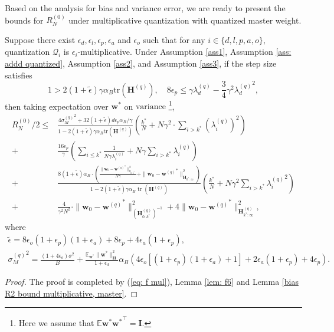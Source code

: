 \documentclass[11pt, letterpaper]{article}
\begin{document}
Based on the analysis for bias and variance error, we are ready to present the bounds for $R_N^{(0)}$ under multiplicative quantization with quantized master weight.
\begin{theorem}
    \label{thm: master multiplicative}
    Suppose there exist $\epsilon_d,\epsilon_l,\epsilon_p,\epsilon_a$ and $\epsilon_o$ such that for any $i\in \{d,l,p,a,o\}$, quantization $\mathcal{Q}_i$ is $\epsilon_i$-multiplicative. Under Assumption \ref{ass1}, Assumption \ref{ass: addd quantized}, Assumption \ref{ass2}, and Assumption \ref{ass3}, if the step size satisfies
    \begin{equation*}
        1>2(1+\tilde{\epsilon})\gamma\alpha_B\mathrm{tr}(\mathbf{H}^{(q)}),\quad 8\epsilon_p\leq \gamma \lambda_d^{(q)}-\frac{3}{4}\gamma^2{\lambda_d^{(q)}}^2,
    \end{equation*}
    then taking expectation over $\mathbf{w}^*$ on $\mathrm{variance}$ \footnote{Here we assume that $\mathbb{E}\mathbf{w}^*{\mathbf{w}^*}^\top=\mathbf{I}$.},
    \begin{equation*}
        \begin{aligned}
            R_N^{(0)}/2\leq &\frac{4{\sigma_M^{(q)}}^2+32(1+\tilde{\epsilon}){d\epsilon_p}\alpha_B/\gamma}{1-2(1+\tilde{\epsilon})\gamma\alpha_B\mathrm{tr}(\mathbf{H}^{(q)})}\left(\frac{k^*}{N}+N\gamma^2\cdot\sum_{i>k^*}(\lambda_i^{(q)})^2\right)\\
            +
            &\frac{16\epsilon_p}{\gamma}\left(\sum_{i\leq k^*}\frac{1}{N\gamma\lambda_i^{(q)}}+N\gamma\sum_{i>k^*}\lambda_i^{(q)}\right)\\
            +& \frac{8(1+\tilde{\epsilon})\alpha_B\cdot\left(\frac{\|\mathbf{w}_{0}-{\mathbf{w}^{(q)}}^{*}\|_{\mathbf{I}_{0:k^{*}}}^{2}}{N\gamma}+\|\mathbf{w}_{0}-{\mathbf{w}^{(q)}}^{*}\|_{\mathbf{H}_{k^{*}:\infty}}^{2}\right)}{1-2(1+\tilde{\epsilon})\gamma\alpha_B\operatorname{tr}(\mathbf{H}^{(q)})}\left(\frac{k^*}{N} + {N\gamma^2}\sum_{i> k^*}{\lambda_i^{(q)}}^2\right)\\
            +& \frac{4}{\gamma^2N^2}\cdot\|\mathbf{w}_0-{\mathbf{w}^{(q)}}^*\|_{(\mathbf{H}_{0:k^*}^{(q)})^{-1}}^2+4\|\mathbf{w}_0-{\mathbf{w}^{(q)}}^*\|_{\mathbf{H}_{{k^*}:\infty}^{(q)}}^2,
        \end{aligned}
    \end{equation*}
    where
    \begin{gather*}
            \tilde{\epsilon}=8\epsilon_o(1+\epsilon_p)(1+\epsilon_a)+8\epsilon_p+4\epsilon_a(1+\epsilon_p),\\
            {\sigma_M^{(q)}}^2=\frac{(1+4\epsilon_o)\sigma^2}{B} + \frac{\mathbb{E}_{\mathbf{w}^*}\|\mathbf{w}^*\|_\mathbf{H}^2}{1+\epsilon_d}\alpha_B\left(4\epsilon_o[(1+\epsilon_p)(1+\epsilon_a)+1]+2\epsilon_a(1+\epsilon_p)+4\epsilon_p \right).
    \end{gather*}
\end{theorem}
\begin{proof}
    The proof is completed by (\ref{eq: f mul}), Lemma \ref{lem: f6} and Lemma \ref{bias R2 bound multiplicative, master}.
\end{proof}%
\end{document}
